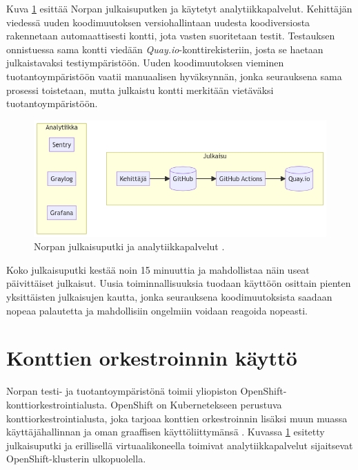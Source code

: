 Kuva \ref{fig:norppa:deployment} esittää Norpan julkaisuputken ja käytetyt analytiikkapalvelut.
Kehittäjän viedessä uuden koodimuutoksen versiohallintaan uudesta koodiversiosta rakennetaan automaattisesti kontti, jota vasten suoritetaan testit.
Testauksen onnistuessa sama kontti viedään \textit{Quay.io}-konttirekisteriin, josta se haetaan julkaistavaksi testiympäristöön.
Uuden koodimuutoksen vieminen tuotantoympäristöön vaatii manuaalisen hyväksynnän, jonka seurauksena sama prosessi toistetaan, mutta julkaistu kontti merkitään vietäväksi tuotantoympäristöön.

\begin{figure}[ht]
\begin{center}
\includegraphics[width=1\textwidth]{figures/norppa_deployment.png}
\caption{Norpan julkaisuputki ja analytiikkapalvelut \cite{Norppa23}\label{fig:norppa:deployment}.}
\end{center}
\end{figure}

Koko julkaisuputki kestää noin 15 minuuttia ja mahdollistaa näin useat päivittäiset julkaisut.
Uusia toiminnallisuuksia tuodaan käyttöön osittain pienten yksittäisten julkaisujen kautta, jonka seurauksena koodimuutoksista saadaan nopeaa palautetta ja mahdollisiin ongelmiin voidaan reagoida nopeasti.

\section{Konttien orkestroinnin käyttö}

Norpan testi- ja tuotantoympäristönä toimii yliopiston OpenShift-konttiorkestrointialusta.
OpenShift on Kubernetekseen perustuva konttiorkestrointialusta, joka tarjoaa konttien orkestroinnin lisäksi muun muassa käyttäjähallinnan ja oman graaffisen käyttöliittymänsä \cite{Lossent17}.
Kuvassa \ref{fig:norppa:deployment} esitetty julkaisuputki ja erillisellä virtuaalikoneella toimivat analytiikkapalvelut sijaitsevat OpenShift-klusterin ulkopuolella.


